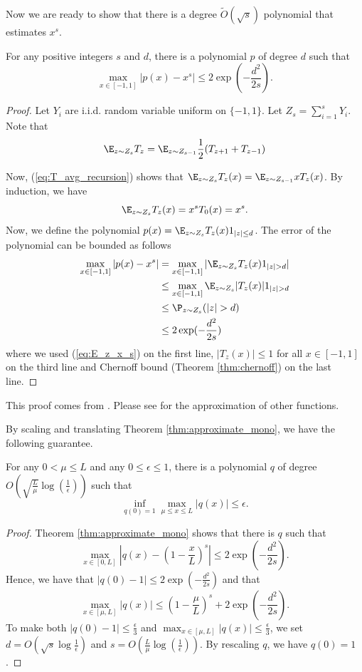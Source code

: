 Now we are ready to show that there is a degree $\tilde{O}(\sqrt{s})$
polynomial that estimates $x^{s}$.
\begin{thm}
\label{thm:approximate_mono}For any positive integers $s$ and $d$,
there is a polynomial $p$ of degree $d$ such that
\[
\max_{x\in[-1,1]}|p(x)-x^{s}|\leq2\exp(-\frac{d^{2}}{2s}).
\]
\end{thm}

\begin{proof}
Let $Y_{i}$ are i.i.d. random variable uniform on $\{-1,1\}$. Let
$Z_{s}=\sum_{i=1}^{s}Y_{i}$. Note that
\[
\E_{z\sim Z_{s}}T_{z}=\E_{z\sim Z_{s-1}}\frac{1}{2}(T_{z+1}+T_{z-1})
\]

Now, (\ref{eq:T_avg_recursion}) shows that $\E_{z\sim Z_{s}}T_{z}(x)=\E_{z\sim Z_{s-1}}xT_{z}(x)$.
By induction, we have
\begin{equation}
\E_{z\sim Z_{s}}T_{z}(x)=x^{s}T_{0}(x)=x^{s}.\label{eq:E_z_x_s}
\end{equation}
Now, we define the polynomial $p(x)=\E_{z\sim Z_{s}}T_{z}(x)1_{|z|\leq d}$.
The error of the polynomial can be bounded as follows
\begin{align*}
\max_{x\in[-1,1]}|p(x)-x^{s}| & =\max_{x\in[-1,1]}|\E_{z\sim Z_{s}}T_{z}(x)1_{|z|>d}|\\
 & \leq\max_{x\in[-1,1]}\E_{z\sim Z_{s}}|T_{z}(x)|1_{|z|>d}\\
 & \leq\P_{z\sim Z_{s}}(|z|>d)\\
 & \leq2\exp(-\frac{d^{2}}{2s})
\end{align*}
where we used (\ref{eq:E_z_x_s}) on the first line, $|T_{z}(x)|\leq1$
for all $x\in[-1,1]$ on the third line and Chernoff bound (Theorem
\ref{thm:chernoff}) on the last line.
\end{proof}
\begin{rem*}
This proof comes from \cite{sachdeva2014faster}. Please see \cite{sachdeva2014faster}
for the approximation of other functions.
\end{rem*}
By scaling and translating Theorem \ref{thm:approximate_mono}, we
have the following guarantee.
\begin{thm}
For any $0<\mu\leq L$ and any $0\leq\epsilon\leq1$, there is a polynomial
$q$ of degree $O(\sqrt{\frac{L}{\mu}}\log(\frac{1}{\epsilon}))$
such that 
\[
\inf_{q(0)=1}\max_{\mu\leq x\leq L}\left|q(x)\right|\leq\epsilon.
\]
\end{thm}

\begin{proof}
Theorem \ref{thm:approximate_mono} shows that there is $q$ such
that 
\[
\max_{x\in[0,L]}\left|q(x)-\left(1-\frac{x}{L}\right)^{s}\right|\leq2\exp(-\frac{d^{2}}{2s}).
\]
Hence, we have that $\left|q(0)-1\right|\leq2\exp(-\frac{d^{2}}{2s})$
and that
\[
\max_{x\in[\mu,L]}\left|q(x)\right|\leq\left(1-\frac{\mu}{L}\right)^{s}+2\exp(-\frac{d^{2}}{2s}).
\]
To make both $|q(0)-1|\leq\frac{\epsilon}{3}$ and $\max_{x\in[\mu,L]}\left|q(x)\right|\leq\frac{\epsilon}{3}$,
we set $d=O(\sqrt{s}\log\frac{1}{\epsilon})$ and $s=O(\frac{L}{\mu}\log(\frac{1}{\epsilon}))$.
By rescaling $q$, we have $q(0)=1$.%
\end{proof}

